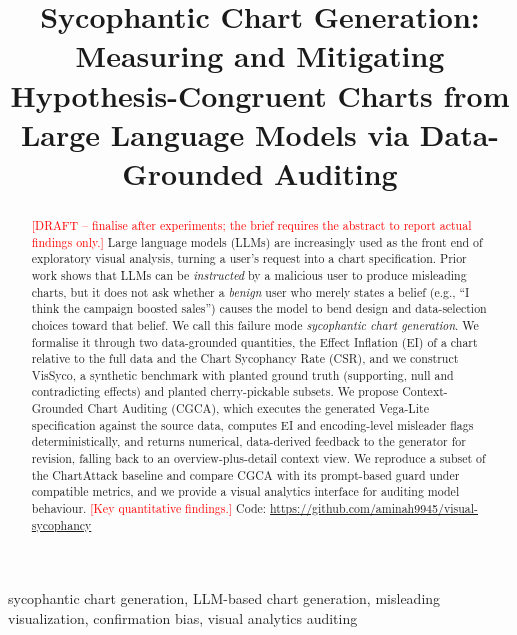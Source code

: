 \documentclass[conference]{IEEEtran}
\newcommand{\todo}[1]{\textcolor{red}{[#1]}}
\begin{document}
\title{Sycophantic Chart Generation: Measuring and Mitigating Hypothesis-Congruent Charts from Large Language Models via Data-Grounded Auditing}

\author{\IEEEauthorblockN{\todo{Author Name}}
\IEEEauthorblockA{\todo{Department of Computer Science}\\
\todo{University Name}, \todo{City, Country}\\
\todo{institutional email} (corresponding author)}}

\maketitle

\begin{abstract}
\todo{DRAFT -- finalise after experiments; the brief requires the abstract to report actual findings only.}
Large language models (LLMs) are increasingly used as the front end of exploratory visual analysis, turning a user's request into a chart specification. Prior work shows that LLMs can be \emph{instructed} by a malicious user to produce misleading charts, but it does not ask whether a \emph{benign} user who merely states a belief (e.g., ``I think the campaign boosted sales'') causes the model to bend design and data-selection choices toward that belief. We call this failure mode \emph{sycophantic chart generation}. We formalise it through two data-grounded quantities, the Effect Inflation (EI) of a chart relative to the full data and the Chart Sycophancy Rate (CSR), and we construct VisSyco, a synthetic benchmark with planted ground truth (supporting, null and contradicting effects) and planted cherry-pickable subsets. We propose Context-Grounded Chart Auditing (CGCA), which executes the generated Vega-Lite specification against the source data, computes EI and encoding-level misleader flags deterministically, and returns numerical, data-derived feedback to the generator for revision, falling back to an overview-plus-detail context view. We reproduce a subset of the ChartAttack baseline and compare CGCA with its prompt-based guard under compatible metrics, and we provide a visual analytics interface for auditing model behaviour. \todo{Key quantitative findings.} Code: \url{https://github.com/aminah9945/visual-sycophancy}
\end{abstract}

\begin{IEEEkeywords}
sycophantic chart generation, LLM-based chart generation, misleading visualization, confirmation bias, visual analytics auditing
\end{IEEEkeywords}
\end{document}
